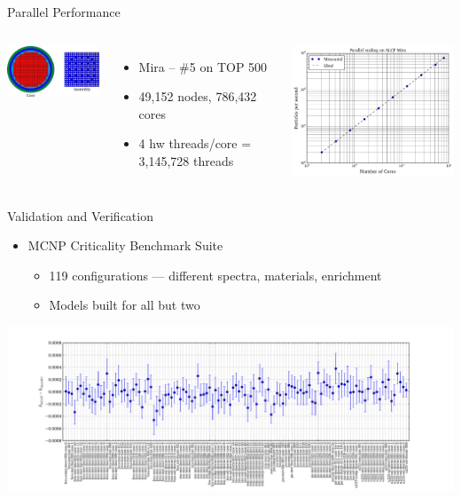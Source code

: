 \documentclass[noamssymb,svgnames]{beamer}
\begin{document}
\begin{frame}{Parallel Performance}
  \begin{columns}
    \begin{center}
      \includegraphics[width=1.7in]{../images/mcperformance.pdf}
    \end{center}
    \footnotesize{
      \begin{itemize}
      \item Mira -- \#5 on TOP 500
      \item 49,152 nodes, 786,432 cores
      \item 4 hw threads/core = 3,145,728 threads
      \end{itemize}
    }
    \includegraphics[width=3.0in]{../images/scaling_loglog.pdf}
  \end{columns}
\end{frame}

\begin{frame}{Validation and Verification}
  \begin{itemize}
  \item MCNP Criticality Benchmark Suite
    \begin{itemize}
    \item 119 configurations --- different spectra, materials, enrichment
    \item Models built for all but two
    \end{itemize}
  \end{itemize}
  \centerline{
    \includegraphics[width=1.35\textwidth]{../images/expanded-suite.pdf}
  }
\end{frame}
\end{document}
